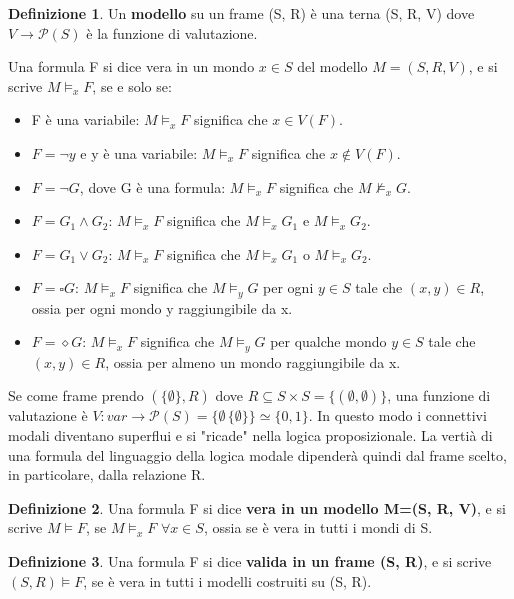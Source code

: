 \documentclass{article}
\theoremstyle{definition}
\newtheorem{definizione}{Definizione}
\theoremstyle{plain}
\theoremstyle{plain}
\theoremstyle{plain}
\theoremstyle{plain}
\begin{document}
\begin{definizione}
    Un \textbf{modello} su un frame (S, R) è una terna (S, R, V) dove $V \rightarrow \mathcal{P}(S)$ è la funzione di valutazione.
\end{definizione}
Una formula F si dice vera in un mondo $x \in S$ del modello $M = (S, R, V)$, e si scrive $M \models_x F$, se e solo se: 
\begin{itemize}
    \item F è una variabile: $M \models_x F$ significa che $x \in V(F)$.
    \item $F = \neg y$ e y è una variabile: $M \models_x F$ significa che $x \notin V(F)$.
    \item $F = \neg G$, dove G è una formula: $M \models_x F$ significa che $M \not\models_x G$.
    \item $F = G_1 \land G_2$: $M \models_x F$ significa che $M \models_x G_1$ e $M \models_x G_2$.
    \item $F = G_1 \lor G_2$: $M \models_x F$ significa che $M \models_x G_1$ o $M \models_x G_2$.
    \item $F = \square G$: $M \models_x F$ significa che $M \models_y G$ per ogni $y \in S$ tale che $(x, y) \in R$, ossia per ogni mondo y raggiungibile da x.
    \item $F = \diamond G$: $M \models_x F$ significa che $M \models_y G$ per qualche mondo $y \in S$ tale che $(x, y) \in R$, ossia per almeno un mondo raggiungibile da x.
\end{itemize}
Se come frame prendo $(\{\emptyset\}, R)$ dove $R \subseteq S \times S = \{(\emptyset, \emptyset)\}$, una funzione di valutazione è $V : var \rightarrow \mathcal{P}(S) = \{ \emptyset \, \{\emptyset\}\} \simeq \{0, 1\} $. 
In questo modo i connettivi modali diventano superflui e si "ricade" nella logica proposizionale. \newline
La vertià di una formula del linguaggio della logica modale dipenderà quindi dal frame scelto, in particolare, dalla relazione R.

\begin{definizione}
    Una formula F si dice \textbf{vera in un modello M=(S, R, V)}, e si scrive $M \models F$, se $M \models_x F$ $\forall x \in S$, ossia se è vera in tutti i mondi di S.
\end{definizione}

\begin{definizione}
    Una formula F si dice \textbf{valida in un frame (S, R)}, e si scrive $(S, R) \models F$, se è vera in tutti i modelli costruiti su (S, R).
\end{definizione}
\end{document}
